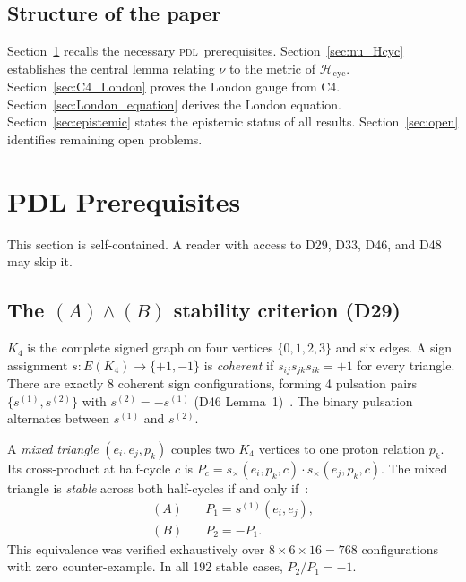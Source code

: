\documentclass[12pt,a4paper]{article}
\newcommand{\Kfour}{K_4}
\newcommand{\PDL}{\textsc{pdl}}
\newcommand{\Hcyc}{\mathcal{H}_{\mathrm{cyc}}}
\begin{document}
\subsection{Structure of the paper}

Section~\ref{sec:prereq} recalls the necessary \PDL\ prerequisites. Section~\ref{sec:nu_Hcyc} establishes the central lemma relating $\nu$ to the metric of $\Hcyc$. Section~\ref{sec:C4_London} proves the London gauge from C4. Section~\ref{sec:London_equation} derives the London equation. Section~\ref{sec:epistemic} states the epistemic status of all results. Section~\ref{sec:open} identifies remaining open problems.

\section{PDL Prerequisites}
\label{sec:prereq}

This section is self-contained. A reader with access to D29, D33, D46, and D48 may skip it.

\subsection{The \texorpdfstring{$(A)\wedge(B)$}{(A)∧(B)} stability criterion (D29)}

$\Kfour$ is the complete signed graph on four vertices $\{0,1,2,3\}$ and six edges. A sign assignment $s: E(\Kfour) \to \{+1,-1\}$ is \emph{coherent} if $s_{ij}s_{jk}s_{ik} = +1$ for every triangle. There are exactly 8 coherent sign configurations, forming 4 pulsation pairs $\{s^{(1)}, s^{(2)}\}$ with $s^{(2)} = -s^{(1)}$ (D46 Lemma~1)~\cite{PDL_D46_2026}. The binary pulsation alternates between $s^{(1)}$ and $s^{(2)}$.

A \emph{mixed triangle} $(e_i, e_j, p_k)$ couples two $\Kfour$ vertices to one proton relation $p_k$. Its cross-product at half-cycle $c$ is $P_c = s_\times(e_i,p_k,c)\cdot s_\times(e_j,p_k,c)$. The mixed triangle is \emph{stable} across both half-cycles if and only if~\cite{PDL_D29_2026}:
\begin{align}
(A) &\quad P_1 = s^{(1)}(e_i,e_j), \label{eq:condA} \\
(B) &\quad P_2 = -P_1. \label{eq:condB}
\end{align}
This equivalence was verified exhaustively over $8 \times 6 \times 16 = 768$ configurations with zero counter-example. In all 192 stable cases, $P_2/P_1 = -1$.
\end{document}
